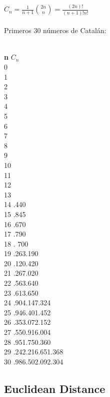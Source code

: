 \documentclass[11pt,letterpaper,twocolumn,twosided]{article}
\begin{document}
{\LARGE $C_{n} = \frac{1}{n+1}\binom{2n}{n} = \frac{(2n)!}{(n+1)!n!}$}
\\ \\
Primeros 30 n\'umeros de Catal\'an:
\\ \\
\begin{tabbing}
\textbf{n}\hspace{3cm} \=  \textbf{$C_{n}$}\hspace{4cm}  \\ 
0  \\ 
1  \\ 
2  \\ 
3  \\ 
4  \\ 
5  \\ 
6  \\ 
7  \\ 
8 \\ 
9 \\ 
10 \\ 
11 \\
12 \\
13 \\ 
14 .440\\ 
15 .845\\ 
16 .670\\
17 .790\\
18 . 700\\
19 .263.190\\
20 .120.420\\ 
21 .267.020\\
22 .563.640\\ 
23 .613.650\\ 
24 .904.147.324\\
25 .946.401.452\\ 
26 .353.072.152\\ 
27 .550.916.004\\ 
28 .951.750.360\\ 
29 .242.216.651.368\\
30 .986.502.092.304\\ 
\end{tabbing}


\subsection{Euclidean Distance}
\end{document}
